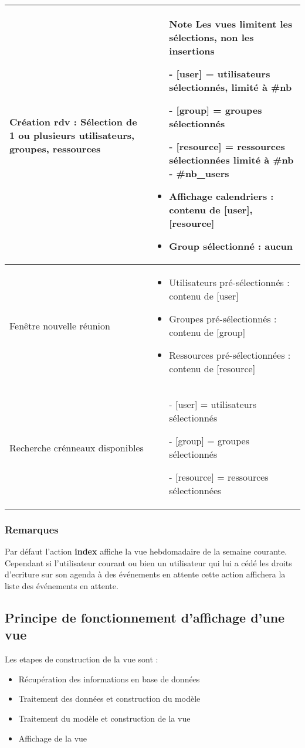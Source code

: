 \begin{longtable}{|p{4cm}|p{10cm}|}
\hline
Création rdv : Sélection de 1 ou plusieurs utilisateurs, groupes, ressources
&
\begin{itemize}
\item[Note] Les vues limitent les sélections, non les insertions
\item[-] [user] = utilisateurs sélectionnés, limité à \#nb
\item[-] [group] = groupes sélectionnés
\item[-] [resource] = ressources sélectionnées limité à \#nb - \#nb\_users
\item Affichage calendriers  : contenu de [user], [resource] 
\item Group sélectionné : aucun
\end{itemize}
\\

\hline
Fenêtre nouvelle réunion
&
\begin{itemize}
\item Utilisateurs pré-sélectionnés : contenu de [user] 
\item Groupes pré-sélectionnés : contenu de [group] 
\item Ressources pré-sélectionnées : contenu de [resource] 
\end{itemize}
\\ 

\hline
Recherche crénneaux disponibles
&
\begin{itemize}
\item[-] [user] = utilisateurs sélectionnés
\item[-] [group] = groupes sélectionnés
\item[-] [resource] = ressources sélectionnées
\end{itemize}
\\
\hline
\end{longtable}



\subsubsection{Remarques}
 Par défaut l'action \textbf{index} affiche la vue hebdomadaire de la semaine
 courante. Cependant si l'utilisateur courant ou bien un utilisateur qui lui a 
 cédé les droits d'ecriture sur son agenda à des événements en attente cette
 action affichera la liste des événements en attente.

\subsection{Principe de fonctionnement d'affichage d'une vue}
 Les etapes de construction de la vue sont :
 \begin{itemize}
  \item{Récupération des informations en base de données}
  \item{Traitement des données et construction du modèle}
  \item{Traitement du modèle et construction de la vue}
  \item{Affichage de la vue}
 \end{itemize}

